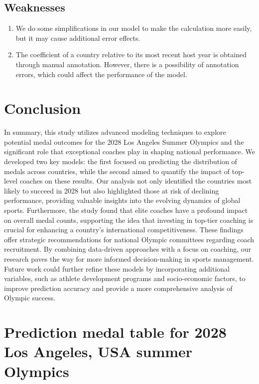 \documentclass[12pt]{article}
\begin{document}
\subsection{Weaknesses}
\begin{enumerate}
    \item We do some simplifications in our model to make the calculation more easily, but it may cause additional error effects.
    \item The coefficient of a country relative to its most recent host year is obtained through manual annotation. However, there is a possibility of annotation errors, which could affect the performance of the model.
\end{enumerate}

\section{Conclusion}
\quad \quad In summary, this study utilizes advanced modeling techniques to explore potential medal outcomes for the 2028 Los Angeles Summer Olympics and the significant role that exceptional coaches play in shaping national performance. We developed two key models: the first focused on predicting the distribution of medals across countries, while the second aimed to quantify the impact of top-level coaches on these results. Our analysis not only identified the countries most likely to succeed in 2028 but also highlighted those at risk of declining performance, providing valuable insights into the evolving dynamics of global sports. Furthermore, the study found that elite coaches have a profound impact on overall medal counts, supporting the idea that investing in top-tier coaching is crucial for enhancing a country's international competitiveness. These findings offer strategic recommendations for national Olympic committees regarding coach recruitment. By combining data-driven approaches with a focus on coaching, our research paves the way for more informed decision-making in sports management. Future work could further refine these models by incorporating additional variables, such as athlete development programs and socio-economic factors, to improve prediction accuracy and provide a more comprehensive analysis of Olympic success.

\newpage




\newpage


\appendix
\section{Prediction medal table for 2028 Los Angeles, USA summer Olympics}
\end{document}
